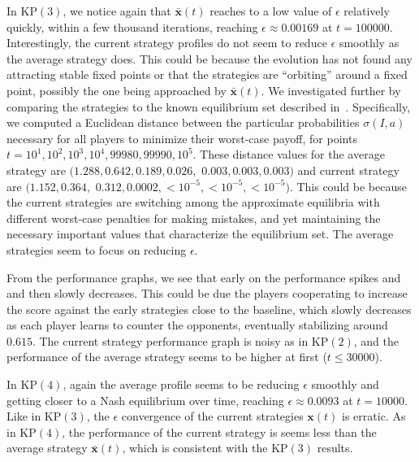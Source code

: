 \documentclass{aamas2014}
\newcommand{\bx}{\mathbf{x}}
\begin{document}

In KP$(3)$, we notice again that $\bar{\bx}(t)$ reaches to a low value of $\epsilon$ relatively quickly, within 
a few thousand iterations, reaching $\epsilon \approx 0.00169$ at $t = 100000$. 
Interestingly, the current strategy profiles do not seem to reduce $\epsilon$ smoothly as the average strategy does. This could be because the evolution 
has not found any attracting stable fixed points or that the strategies are ``orbiting'' around a fixed point, possibly the one 
being approached by $\bar{\bx}(t)$. We investigated further by comparing the strategies to the known equilibrium set described 
in~\cite{Szafron13Kuhn}. Specifically, we computed a Euclidean distance between the particular probabilities $\sigma(I,a)$ necessary for 
all players to minimize their worst-case payoff, for points $t = 10^1, 10^2, 10^3, 10^4, 99980, 99990, 10^5$. These distance values for the average 
strategy are $(1.288,0.642,0.189,0.026,$ $0.003,0.003,0.003)$ and current strategy are
$(1.152,0.364,$ $0.312, 0.0002, <10^{-5},  <10^{-5},  <10^{-5})$. This could be because the
current strategies are switching among the approximate equilibria with different worst-case penalties for making mistakes, 
and yet maintaining the necessary important values that characterize the equilibrium set.  
The average strategies seem to focus on reducing $\epsilon$. 

From the performance graphs, we see that early on the performance spikes and 
and then slowly decreases. This could be due the players cooperating to increase the score against the early 
strategies close to the baseline, which slowly decreases as each player learns to counter the opponents, 
eventually stabilizing around $0.615$. The current strategy
performance graph is noisy as in KP$(2)$, and the performance of the average strategy seems to be higher at first ($t \le 30000$). 

In KP$(4)$, again the average profile seems to be reducing $\epsilon$ smoothly and getting closer to a Nash equilibrium 
over time, reaching $\epsilon \approx 0.0093$ at $t = 10000$. 
Like in KP$(3)$, the $\epsilon$ convergence of the current strategies $\bx(t)$ is erratic. 
As in KP$(4)$, the performance of the current strategy is seems less than the average 
strategy $\bar{\bx}(t)$, which is consistent with the KP$(3)$ results. 
\end{document}
